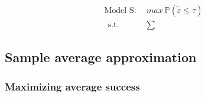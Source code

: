 \documentclass[preprint,12pt,authoryear]{elsarticle}
\newcommand{\bP}{\mathbb P}
\begin{document}
\begin{align}
	\text{Model S}:~~&max~\bP(\tilde{\varepsilon} \leq \tau) \nonumber\\~~
	\mbox{s.t.}~~
	&\sum 
\end{align}

\subsection{Sample average approximation}
%

\subsubsection{Maximizing average success}\label{maxsuccess}
\end{document}
